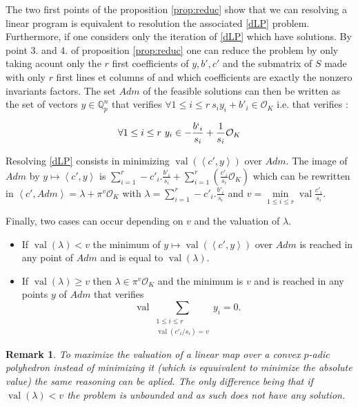\documentclass[a4paper,12pt]{article}
\newtheorem{remark}{Remark}
\DeclareMathOperator{\val}{val}
\newcommand{\OK}{\mathcal{O}_K}
\begin{document}
The two first points of the proposition \ref{prop:reduc} show that we can resolving a linear program is equivalent to resolution the associated \ref{dLP} problem. Furthermore, if one considers only the iteration of \ref{dLP} which have solutions. By point 3. and 4. of proposition \ref{prop:reduc} one can reduce the problem by only taking acount only the $r$ first coefficients of $y, b', c'$ and the submatrix of $S$ made with only $r$ first lines et columns of and which coefficients are exactly the nonzero invariants factors. The set $Adm$ of the feasible solutions can then be written as the set of vectors $y \in \mathbb{Q}_{ p } ^n$ that verifies $\forall 1 \le i\le r \ s_i y_i + b'_i \in \OK$ i.e. that verifies :

\begin{equation}
	\forall 1 \le i\le r  \ y_i \in -\frac{b`_i}{s_i} + \frac{1}{s_i} \OK
\end{equation}


Resolving \ref{dLP} consists in minimizing $\val\left(\left<c',y \right>\right)$ over $Adm$. The image of $Adm$ by $y \mapsto \left<c',y \right>$ is $\sum_{i=1}^r -c'_i.\frac{b'_i}{s_i} + \sum_{i=1}^r\left( \frac{c'_i}{s_{i}} \OK \right)$ which can be rewritten in $\left<c',Adm \right> = \lambda + \pi^{v} \OK$ with $\lambda = \sum_{i=1}^r -c'_i.\frac{b'_i}{s_i}$ and $v = \min\limits_{1\le i\le r} \val \frac{c'_{i}}{s_{i}} $.

Finally, two cases can occur depending on $v$ and the valuation of $\lambda$.
\begin{itemize}
	\item If $\val( \lambda) < v$ the minimum of $y\mapsto \val\left(\left<c',y \right>\right)$ over $Adm$ is reached in any point of $Adm$ and is equal to $\val\left( \lambda\right)$.
	\item If $\val\left( \lambda \right) \ge v$ then $\lambda \in \pi^{v} \OK$ and the minimum is $v $ and is reached in any points $y$ of $Adm$ that verifies 
	\[\val \underset{ \begin{array}{c} 1\le i\le r\\ \val\left(c'_{i}/{s_{i}} \right) = v  \end{array}}{\sum} y_{i} = 0. \]
	
\end{itemize}
\begin{remark}
	To maximize the valuation of a linear map over a convex $p$-adic polyhedron instead of minimizing it (which is equuivalent to minimize the absolute value) the same reasoning can be aplied. The only difference being that if $\val\left( \lambda\right) < v$ the problem is unbounded and as such does not have any solution. 
\end{remark}
\end{document}
